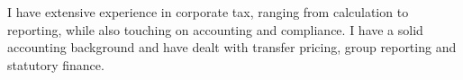 


\begin{cvparagraph}

    I have extensive experience in corporate tax, ranging from calculation to reporting, while also touching on accounting and compliance. I have a solid accounting background and have dealt with transfer pricing, group reporting and statutory finance.

\end{cvparagraph}
